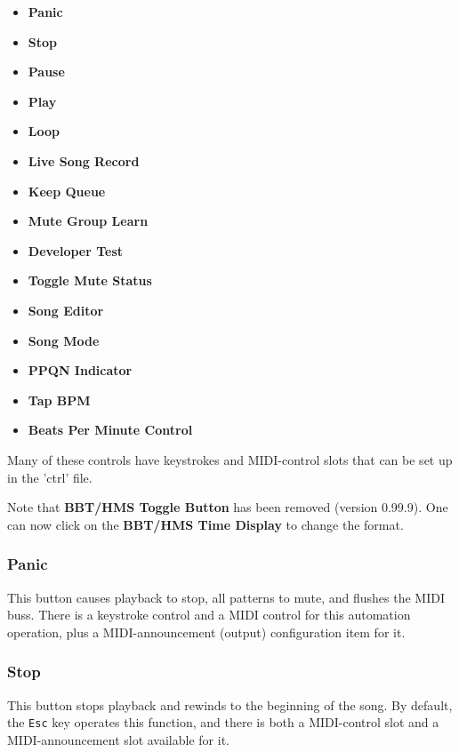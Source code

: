    \begin{itemize}
      \item \textbf{Panic}
      \item \textbf{Stop}
      \item \textbf{Pause}
      \item \textbf{Play}
      \item \textbf{Loop}
      \item \textbf{Live Song Record}
      \item \textbf{Keep Queue}
      \item \textbf{Mute Group Learn}
      \item \textbf{Developer Test}
      \item \textbf{Toggle Mute Status}
      \item \textbf{Song Editor}
      \item \textbf{Song Mode}
      \item \textbf{PPQN Indicator}
      \item \textbf{Tap BPM}
      \item \textbf{Beats Per Minute Control}
   \end{itemize}

   Many of these controls have keystrokes and MIDI-control slots that can be
   set up in the 'ctrl' file.

   Note that \textbf{BBT/HMS Toggle Button} has been removed
   (version 0.99.9).
   One can now click on the \textbf{BBT/HMS Time Display} to
   change the format.

\subsubsection{Panic}
\label{subsubsec:introduction_panic_button}

   This button causes playback to stop, all patterns to mute, and flushes the
   MIDI buss.
   There is a keystroke control and a MIDI control
   for this automation operation, plus
   a MIDI-announcement (output) configuration item for it.

\subsubsection{Stop}
\label{subsubsec:introduction_stop_button}

   This button stops playback and rewinds to the beginning of the song.
   By default, the \texttt{Esc} key operates this function,
   and there is both a MIDI-control slot and a MIDI-announcement slot
   available for it.

